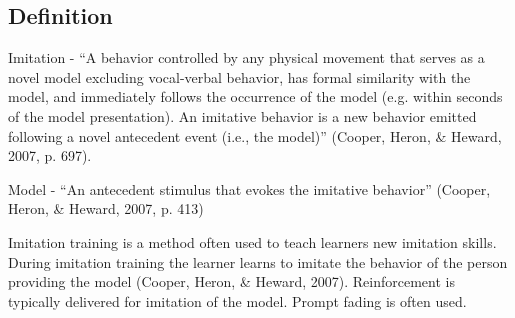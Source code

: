 \subsection{Definition}
Imitation - ``A behavior controlled by any physical movement that serves as a novel model excluding vocal-verbal behavior, has formal similarity with the model, and immediately follows the occurrence of the model (e.g. within seconds of the model presentation).  An imitative behavior is a new behavior emitted following a novel antecedent event (i.e., the model)'' (Cooper, Heron, \& Heward, 2007, p. 697).

Model - ``An antecedent stimulus that evokes the imitative behavior'' (Cooper, Heron, \& Heward, 2007, p. 413)

Imitation training is a method often used to teach learners new imitation skills.  During imitation training the learner learns to imitate the behavior of the person providing the model (Cooper, Heron, \& Heward, 2007). Reinforcement is typically delivered for imitation of the model. Prompt fading is often used.  

